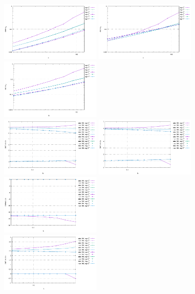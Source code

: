 \begin{center}
\includegraphics[width=5cm]{python_codes/fieldstone_75/results/burst/errors_exy}
\includegraphics[width=5cm]{python_codes/fieldstone_75/results/burst/errors_exz}
\includegraphics[width=5cm]{python_codes/fieldstone_75/results/burst/errors_eyz}\\
\includegraphics[width=5cm]{python_codes/fieldstone_75/results/burst/exx_stats.pdf}
\includegraphics[width=5cm]{python_codes/fieldstone_75/results/burst/eyy_stats.pdf}
\includegraphics[width=5cm]{python_codes/fieldstone_75/results/burst/ezz_stats.pdf}\\
\includegraphics[width=5cm]{python_codes/fieldstone_75/results/burst/exy_stats.pdf}

\end{center}
